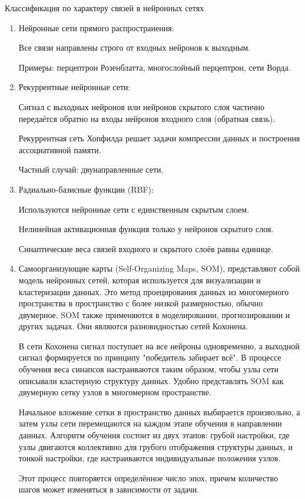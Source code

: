 Классификация по характеру связей в нейронных сетях
\begin{enumerate}
\item   Нейронные сети прямого распространения:

	Все связи направлены строго от входных нейронов к выходным.

	Примеры: перцептрон Розенблатта, многослойный перцептрон, сети Ворда.

\item Рекуррентные нейронные сети:

	Сигнал с выходных нейронов или нейронов скрытого слоя частично передаётся обратно на входы нейронов входного слоя (обратная связь).
	
	Рекуррентная сеть Хопфилда решает задачи компрессии данных и построения ассоциативной памяти.
	
	Частный случай: двунаправленные сети.
	
 \item Радиально-базисные функции (RBF):

	Используются нейронные сети с единственным скрытым слоем.
	
	Нелинейная активационная функция только у нейронов скрытого слоя.
	
	Синаптические веса связей входного и скрытого слоёв равны единице.
\item Самоорганизующие карты (Self-Organizing Maps, SOM), представляют собой модель нейронных сетей, которая используется для визуализации и кластеризации данных. Это метод проецирования данных из многомерного пространства в пространство с более низкой размерностью, обычно двумерное. SOM также применяются в моделировании, прогнозировании и других задачах. Они являются разновидностью сетей Кохонена.

В сети Кохонена сигнал поступает на все нейроны одновременно, а выходной сигнал формируется по принципу "победитель забирает всё". В процессе обучения веса синапсов настраиваются таким образом, чтобы узлы сети описывали кластерную структуру данных. Удобно представлять SOM как двумерную сетку узлов в многомерном пространстве.

Начальное вложение сетки в пространство данных выбирается произвольно, а затем узлы сети перемещаются на каждом этапе обучения в направлении данных. Алгоритм обучения состоит из двух этапов: грубой настройки, где узлы двигаются коллективно для грубого отображения структуры данных, и тонкой настройки, где настраиваются индивидуальные положения узлов.

Этот процесс повторяется определённое число эпох, причем количество шагов может изменяться в зависимости от задачи.
\end{enumerate}

